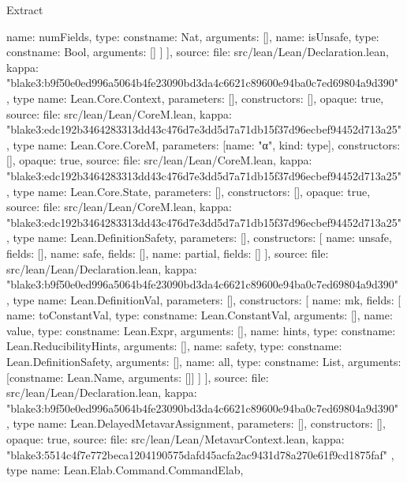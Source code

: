 \begin{lexlean}{Extract}
\begin{toolingmodule}
{{{            {name: numFields, type: const{name: Nat, arguments: []}},
            {name: isUnsafe, type: const{name: Bool, arguments: []}}
          ]
        }
      ],
      source: {
        file: src/lean/Lean/Declaration.lean,
        kappa: "blake3:b9f50e0ed996a5064b4fe23090bd3da4c6621c89600e94ba0c7ed69804a9d390"
      }
    },
    type{
      name: Lean.Core.Context,
      parameters: [],
      constructors: [],
      opaque: true,
      source: {
        file: src/lean/Lean/CoreM.lean,
        kappa: "blake3:edc192b3464283313dd43c476d7e3dd5d7a71db15f37d96ecbef94452d713a25"
      }
    },
    type{
      name: Lean.Core.CoreM,
      parameters: [{name: "α", kind: type{}}],
      constructors: [],
      opaque: true,
      source: {
        file: src/lean/Lean/CoreM.lean,
        kappa: "blake3:edc192b3464283313dd43c476d7e3dd5d7a71db15f37d96ecbef94452d713a25"
      }
    },
    type{
      name: Lean.Core.State,
      parameters: [],
      constructors: [],
      opaque: true,
      source: {
        file: src/lean/Lean/CoreM.lean,
        kappa: "blake3:edc192b3464283313dd43c476d7e3dd5d7a71db15f37d96ecbef94452d713a25"
      }
    },
    type{
      name: Lean.DefinitionSafety,
      parameters: [],
      constructors: [
        {name: unsafe, fields: []},
        {name: safe, fields: []},
        {name: partial, fields: []}
      ],
      source: {
        file: src/lean/Lean/Declaration.lean,
        kappa: "blake3:b9f50e0ed996a5064b4fe23090bd3da4c6621c89600e94ba0c7ed69804a9d390"
      }
    },
    type{
      name: Lean.DefinitionVal,
      parameters: [],
      constructors: [
        {
          name: mk,
          fields: [
            {name: toConstantVal, type: const{name: Lean.ConstantVal, arguments: []}},
            {name: value, type: const{name: Lean.Expr, arguments: []}},
            {name: hints, type: const{name: Lean.ReducibilityHints, arguments: []}},
            {name: safety, type: const{name: Lean.DefinitionSafety, arguments: []}},
            {name: all, type: const{name: List, arguments: [const{name: Lean.Name, arguments: []}]}}
          ]
        }
      ],
      source: {
        file: src/lean/Lean/Declaration.lean,
        kappa: "blake3:b9f50e0ed996a5064b4fe23090bd3da4c6621c89600e94ba0c7ed69804a9d390"
      }
    },
    type{
      name: Lean.DelayedMetavarAssignment,
      parameters: [],
      constructors: [],
      opaque: true,
      source: {
        file: src/lean/Lean/MetavarContext.lean,
        kappa: "blake3:5514c4f7e772beca1204190575dafd45acfa2ac9431d78a270e61f9cd1875faf"
      }
    },
    type{
      name: Lean.Elab.Command.CommandElab,
}}
\end{toolingmodule}
\end{lexlean}
